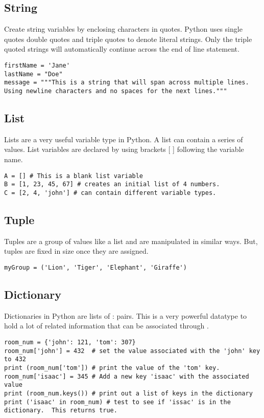 \documentclass[a4paper,9pt]{extarticle}
\begin{document}
\begin{multicols*}{2}
\subsection{String}
Create string variables by enclosing characters in quotes. Python uses single quotes  double quotes  and triple quotes  to denote literal strings. Only the triple quoted strings  will automatically continue across the end of line statement.

\begin{lstlisting}
firstName = 'Jane'
lastName = "Doe"
message = """This is a string that will span across multiple lines. Using newline characters and no spaces for the next lines."""
\end{lstlisting}

\subsection{List}
Lists are a very useful variable type in Python. A list can contain a series of values. List variables are declared by using brackets [ ] following the variable name.

\begin{lstlisting}
A = [] # This is a blank list variable
B = [1, 23, 45, 67] # creates an initial list of 4 numbers.
C = [2, 4, 'john'] # can contain different variable types.
\end{lstlisting}

\subsection{Tuple}
Tuples are a group of values like a list and are manipulated in similar ways. But, tuples are fixed in size once they are assigned.

\begin{lstlisting}
myGroup = ('Lion', 'Tiger', 'Elephant', 'Giraffe')
\end{lstlisting}

\subsection{Dictionary}
Dictionaries in Python are lists of : pairs. This is a very powerful datatype to hold a lot of related information that can be associated through .

\begin{lstlisting}
room_num = {'john': 121, 'tom': 307}
room_num['john'] = 432  # set the value associated with the 'john' key to 432
print (room_num['tom']) # print the value of the 'tom' key.
room_num['isaac'] = 345 # Add a new key 'isaac' with the associated value
print (room_num.keys()) # print out a list of keys in the dictionary
print ('isaac' in room_num) # test to see if 'issac' is in the dictionary.  This returns true.
\end{lstlisting}



\end{multicols*}
\end{document}
